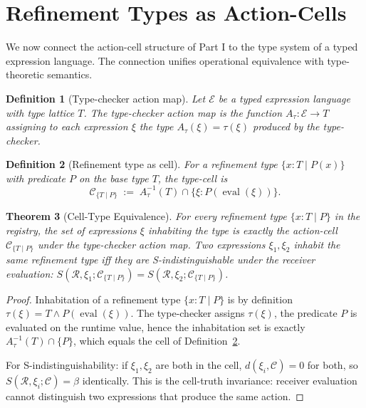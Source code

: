 \documentclass[11pt,a4paper]{article}
\newtheorem{theorem}{Theorem}[section]
\newtheorem{definition}[theorem]{Definition}
\DeclareMathOperator{\eval}{eval}
\newcommand{\Cell}{\mathcal{C}}
\newcommand{\receiver}{\mathcal{R}}
\newcommand{\Sscalar}{S}
\begin{document}
\section{Refinement Types as Action-Cells}
\label{sec:cell-types}

We now connect the action-cell structure of Part I to the type system of a typed expression language. The connection unifies operational equivalence with type-theoretic semantics.

\begin{definition}[Type-checker action map]
\label{def:type-action}
Let $\mathcal{E}$ be a typed expression language with type lattice $T$. The \emph{type-checker action map} is the function $A_{\tau} : \mathcal{E} \to T$ assigning to each expression $\xi$ the type $A_{\tau}(\xi) = \tau(\xi)$ produced by the type-checker.
\end{definition}

\begin{definition}[Refinement type as cell]
\label{def:refinement-cell}
For a refinement type $\{x : T \mid P(x)\}$ with predicate $P$ on the base type $T$, the \emph{type-cell} is
\[
\Cell_{\{T \mid P\}} \;:=\; A_{\tau}^{-1}(T) \cap \{ \xi : P(\eval(\xi)) \}.
\]
\end{definition}

\begin{theorem}[Cell-Type Equivalence]
\label{thm:cell-type}
For every refinement type $\{x : T \mid P\}$ in the registry, the set of expressions $\xi$ inhabiting the type is exactly the action-cell $\Cell_{\{T \mid P\}}$ under the type-checker action map. Two expressions $\xi_1, \xi_2$ inhabit the same refinement type iff they are S-indistinguishable under the receiver evaluation: $\Sscalar(\receiver, \xi_1; \Cell_{\{T \mid P\}}) = \Sscalar(\receiver, \xi_2; \Cell_{\{T \mid P\}})$.
\end{theorem}

\begin{proof}
Inhabitation of a refinement type $\{x : T \mid P\}$ is by definition $\tau(\xi) = T \wedge P(\eval(\xi))$. The type-checker assigns $\tau(\xi)$, the predicate $P$ is evaluated on the runtime value, hence the inhabitation set is exactly $A_{\tau}^{-1}(T) \cap \{P\}$, which equals the cell of Definition~\ref{def:refinement-cell}.

For S-indistinguishability: if $\xi_1, \xi_2$ are both in the cell, $d(\xi_i, \Cell) = 0$ for both, so $\Sscalar(\receiver, \xi_i; \Cell) = \beta$ identically. This is the cell-truth invariance: receiver evaluation cannot distinguish two expressions that produce the same action.
\end{proof}
\end{document}
